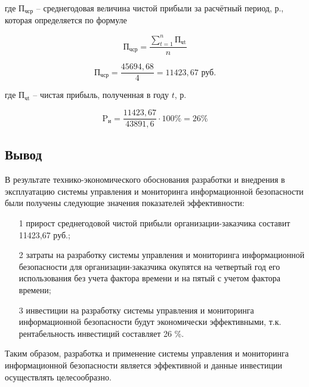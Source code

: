 где $\text{П}_\text{чср}$ – среднегодовая величина чистой прибыли за расчётный период, р., которая определяется по формуле

$$
\text{П}_\text{чср} = \frac{\sum_{t=1}^{n}\text{П}_\text{чt}}{n}
$$

$$
 \text{П}_\text{чср} = \frac{45694,68}{4} = 11423,67 \text{ руб}.
$$

где $\text{П}_\text{чt}$ – чистая прибыль, полученная в году $t$, р.

$$
 \text{P}_\text{и} = \frac{11423,67}{43891,6} \cdot 100\% = 26\%
$$

\subsection{Вывод}
В результате технико-экономического обоснования разработки и внедрения в эксплуатацию системы управления и мониторинга информационной безопасности были получены следующие значения показателей эффективности:

\begin{enumerate}
\item[1] прирост среднегодовой чистой прибыли организации-заказчика составит 11423,67 руб.;
\item[2] затраты на разработку системы управления и мониторинга информационной безопасности для организации-заказчика окупятся на четвертый год  его использования без учета фактора времени и на пятый с учетом фактора времени;
\item[3] инвестиции на разработку системы управления и мониторинга информационной безопасности будут экономически эффективными, т.к. рентабельность инвестиций составляет 26 \%.
\end{enumerate}

Таким образом, разработка и применение системы управления и мониторинга информационной безопасности является эффективной и данные инвестиции осуществлять целесообразно.